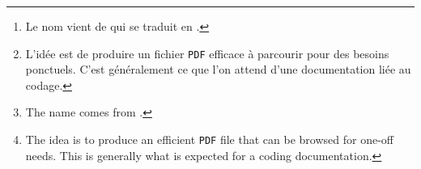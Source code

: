 \begin{abstract}
    La classe \thisproj{}\,%
    \footnote{
        Le nom vient de  qui se traduit en .
    }
    est utilisée par son auteur pour produire de façon sémantique des documentations de packages et de classes \LaTeX\ dans un style de type tutoriel\,%
    \footnote{
        L'idée est de produire un fichier \texttt{PDF} efficace à parcourir pour des besoins ponctuels. C'est généralement ce que l'on attend d'une documentation liée au codage.
    }
    avec un rendu sobre pour une lecture sur écran.

    \smallskip

    \noindent
    \emph{\textbf{Remarque :} cette documentation est aussi disponible en anglais.}

    \smallskip
    \tdocsep
    \small
    \itshape
    \vspace{-5pt}
    \begin{center}
        \textbf{Abstract.}
    \end{center}

    The \thisproj{} class\,%
        \footnote{
            The name comes from .
        }
        is used by its author to semantically produce documentation of \LaTeX\ packages and classes in a tutorial style\,%
        \footnote{
            The idea is to produce an efficient \texttt{PDF} file that can be browsed for one-off needs. This is generally what is expected for a coding documentation.
        }
        with a sober rendering for reading on screen.

        \smallskip

        \noindent
        \emph{\textbf{Remark :} this documentation is also available in French.}
\end{abstract}

\tdocsep

